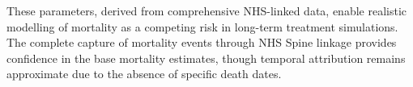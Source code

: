 These parameters, derived from comprehensive NHS-linked data, enable realistic modelling of mortality as a competing risk in long-term treatment simulations. The complete capture of mortality events through NHS Spine linkage provides confidence in the base mortality estimates, though temporal attribution remains approximate due to the absence of specific death dates.